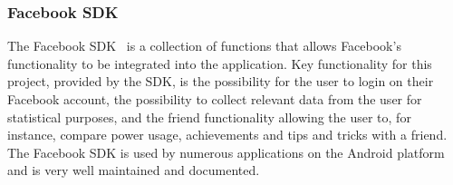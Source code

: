 \subsubsection{Facebook SDK}
The Facebook SDK~\cite{fsdk} is a collection of functions that allows Facebook’s functionality to be integrated into the application. Key functionality for this project, 
provided by the SDK, is the possibility for the user to login on their Facebook account, the possibility to collect relevant data from the user for statistical purposes, and the 
friend functionality allowing the user to, for instance, compare power usage, achievements and tips and tricks with a friend. The Facebook SDK is used by numerous applications 
on the Android platform and is very well maintained and documented. 

